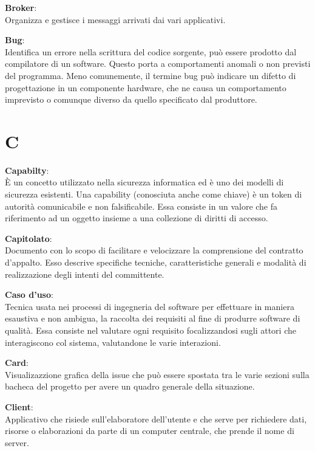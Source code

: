 \documentclass[a4paper, oneside, openany, dvipsnames, table]{article}
\begin{document}
\textbf{Broker}:\\ Organizza e gestisce i messaggi arrivati dai vari applicativi.

\textbf{Bug}:\\	Identifica un errore nella scrittura del codice sorgente, può essere prodotto dal compilatore di un software. Questo porta a comportamenti anomali o non previsti del programma. Meno comunemente, il termine bug può indicare un difetto di progettazione in un componente hardware, che ne causa un comportamento imprevisto o comunque diverso da quello specificato dal produttore.


\newpage
\section{C}

\textbf{Capabilty}:\\ È un concetto utilizzato nella sicurezza informatica ed è uno dei modelli di sicurezza esistenti. Una capability (conosciuta anche come chiave) è un token di autorità comunicabile e non falsificabile. Essa consiste in un valore che fa riferimento ad un oggetto insieme a una collezione di diritti di accesso. 

\textbf{Capitolato}:\\	Documento con lo scopo di facilitare e velocizzare la comprensione del contratto d'appalto. Esso descrive specifiche tecniche, caratteristiche generali e modalità di realizzazione degli intenti del committente.

\textbf{Caso d'uso}:\\	Tecnica usata nei processi di ingegneria del software per effettuare in maniera esaustiva e non ambigua, la raccolta dei requisiti al fine di produrre software di qualità. Essa consiste nel valutare ogni requisito focalizzandosi sugli attori che interagiscono col sistema, valutandone le varie interazioni.

\textbf{Card}:\\ Visualizazzione grafica della issue che può essere spostata tra le varie sezioni sulla bacheca del progetto per avere un quadro generale della situazione.

\textbf{Client}:\\	Applicativo che risiede sull'elaboratore dell'utente e che serve per richiedere dati, risorse o elaborazioni da parte di un computer centrale, che prende il nome di server.
\end{document}
